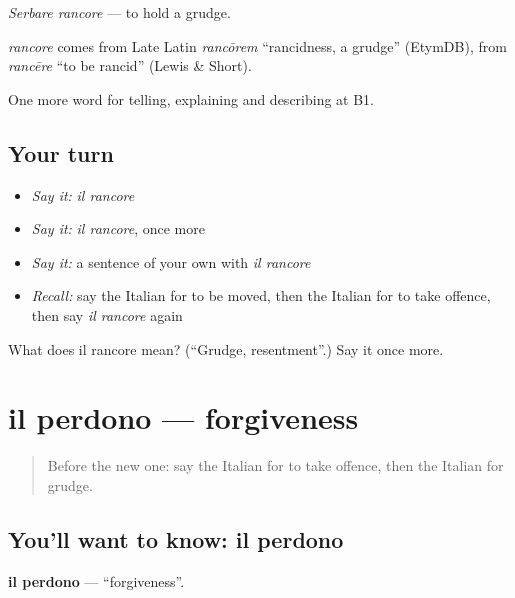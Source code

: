 \emph{Serbare rancore} — to hold a grudge.

\begin{cousinweb}
\emph{rancore} comes from Late Latin \emph{rancōrem} \textquotedblleft{}rancidness, a grudge\textquotedblright{} (EtymDB), from \emph{rancēre} \textquotedblleft{}to be rancid\textquotedblright{} (Lewis \& Short).
\end{cousinweb}

\begin{grammarlens}[title={What you've built}]
One more word for telling, explaining and describing at B1.
\end{grammarlens}

\subsection*{Your turn}
\begin{itemize}
\raggedright
  \item \emph{Say it:} \emph{il rancore}
  \item \emph{Say it:} \emph{il rancore}, once more
  \item \emph{Say it:} a sentence of your own with \emph{il rancore}
  \item \emph{Recall:} say the Italian for to be moved, then the Italian for to take offence, then say \emph{il rancore} again
\end{itemize}

\begin{tcolorbox}[breakable,colback=teal!4,colframe=teal!35!black,title={Before you move on}]
What does il rancore mean? (\textquotedblleft{}Grudge, resentment\textquotedblright{}.) Say it once more.
\end{tcolorbox}
\section[il perdono]{il perdono — forgiveness}

\label{lesson:IT-C480-perdono}



\begin{quote}
Before the new one: say the Italian for to take offence, then the Italian for grudge.
\end{quote}

\subsection*{You'll want to know: il perdono}
\textbf{il perdono} — \textquotedblleft{}forgiveness\textquotedblright{}.

